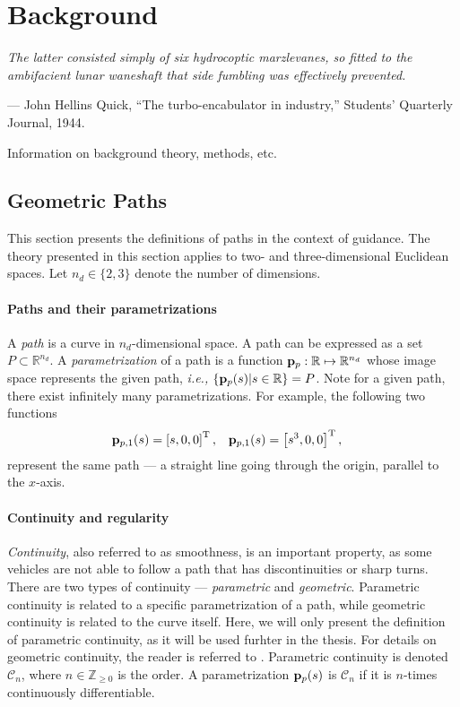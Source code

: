 \chapter{Background}
\label{chap:background}

\setlength{\epigraphwidth}{0.7\textwidth}
\epigraph{ \it
    The latter consisted simply of six hydrocoptic marzlevanes, so fitted to the ambifacient lunar waneshaft that side fumbling was effectively prevented.
}{--- John Hellins Quick, ``The turbo-encabulator in industry,'' Students' Quarterly Journal, 1944.}

Information on background theory, methods, etc.

\section{Geometric Paths}
\label{sec:background_paths}

This section presents the definitions of paths in the context of guidance.
The theory presented in this section applies to two- and three-dimensional Euclidean spaces.
Let $n_d \in \{2,3\}$ denote the number of dimensions.

\subsubsection*{Paths and their parametrizations}
A \emph{path} is a curve in $n_d$-dimensional space.
A path can be expressed as a set $P \subset \mathbb{R}^{n_d}$.
A \emph{parametrization} of a path is a function $\mathbf{p}_p : \mathbb{R} \mapsto \mathbb{R}^{n_d}$ whose image space represents the given path, \emph{i.e.,} $\{\mathbf{p}_p(s) | s \in \mathbb{R}\} = P$.
Note for a given path, there exist infinitely many parametrizations.
For example, the following two functions
\begin{align}
    \mathbf{p}_{p, 1}(s) &= \left[s, 0, 0\right]^{\mathrm{T}}, &
    \mathbf{p}_{p, 1}(s) &= \left[s^3, 0, 0\right]^{\mathrm{T}}, &
\end{align}
represent the same path --- a straight line going through the origin, parallel to the $x$-axis.

\subsubsection*{Continuity and regularity}
\emph{Continuity}, also referred to as smoothness, is an important property, as some vehicles are not able to follow a path that has discontinuities or sharp turns.
There are two types of continuity --- \emph{parametric} and \emph{geometric}.
Parametric continuity is related to a specific parametrization of a path, while geometric continuity is related to the curve itself.
Here, we will only present the definition of parametric continuity, as it will be used furhter in the thesis.
For details on geometric continuity, the reader is referred to \cite{barsky_geometric_1984}.
Parametric continuity is denoted $\mathcal{C}_n$, where $n \in \mathbb{Z}_{\geq 0}$ is the order.
A parametrization $\mathbf{p}_p(s)$ is $\mathcal{C}_n$ if it is $n$-times continuously differentiable.

